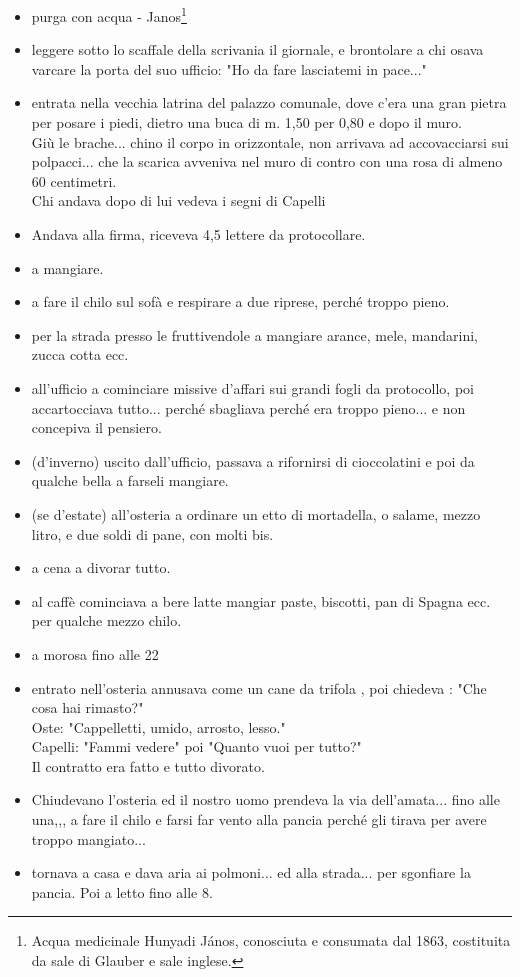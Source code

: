 \documentclass[10pt]{memoir} %
\begin{document}
\begin{itemize}
\item[9.00]purga con acqua - Janos\footnote{Acqua medicinale Hunyadi János, conosciuta e consumata dal 1863, costituita da sale di Glauber e sale inglese.}
\item[10.00]leggere sotto lo scaffale della scrivania il giornale, e brontolare a chi osava varcare la porta del suo ufficio: "Ho da fare lasciatemi in pace..."
\item[11.00]entrata nella vecchia latrina del palazzo comunale, dove c'era una gran pietra per posare i piedi, dietro una buca di m. 1,50 per 0,80 e dopo il muro.\\
Giù le brache... chino il corpo in orizzontale, non arrivava ad accovacciarsi sui polpacci... che la scarica avveniva nel muro di contro con una rosa di almeno 60 centimetri. \\
Chi andava dopo di lui vedeva i segni di Capelli
\item[11.30]Andava alla firma, riceveva 4,5 lettere da protocollare.
\item[12.00] a mangiare.
\item[13.00] a fare il chilo sul sofà e respirare a due riprese, perché troppo pieno.
\item[13.30] per la strada presso le fruttivendole a mangiare arance, mele, mandarini, zucca cotta ecc.
\item[14.00] all'ufficio a cominciare missive d'affari sui grandi fogli da protocollo, poi accartocciava tutto... perché sbagliava perché era troppo pieno... e non concepiva il pensiero.
\item[17.00] (d'inverno) uscito dall'ufficio, passava a rifornirsi di cioccolatini e poi da qualche bella a farseli mangiare.
\item[18.00](se d'estate) all'osteria a ordinare un etto di mortadella, o salame, mezzo litro, e due soldi di pane, con molti bis.
\item[19 - 20] a cena a divorar tutto.
\item[20.30] al caffè cominciava a bere latte mangiar paste, biscotti, pan di Spagna ecc. per qualche mezzo chilo.
\item[21.30] a morosa fino alle 22
\item[22.00] entrato nell'osteria annusava come un cane da trifola , poi chiedeva : "Che cosa hai rimasto?"\\
Oste: "Cappelletti, umido, arrosto, lesso."\\
Capelli: "Fammi vedere" poi "Quanto vuoi per tutto?"	\\ Il contratto era fatto e tutto divorato.
\item[23.00] Chiudevano l'osteria ed il nostro uomo prendeva la via dell'amata... fino alle una,,, a fare il chilo e farsi far vento alla pancia perché gli tirava per avere troppo mangiato...
\item[1.00] tornava a casa e dava aria ai polmoni... ed alla strada... per sgonfiare la pancia. Poi a letto fino alle 8.
\end{itemize}
\end{document}

